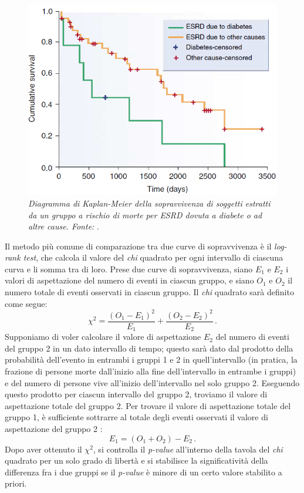 \begin{figure}[htp]
\centering
\includegraphics[scale=0.78]{Immagini/mm_kaplanmeier2.png}
\caption{\label{fig:mm_kaplanmeier2} \textit{Diagramma di Kaplan-Meier della sopravvivenza di soggetti estratti da un gruppo a rischio di morte per ESRD dovuta a diabete o ad altre cause. Fonte:} \cite{Jager2008}.}
\end{figure}

Il metodo più comune di comparazione tra due curve di sopravvivenza è il \textit{log-rank test}, che calcola il valore del \textit{chi} quadrato per ogni intervallo di ciascuna curva e li somma tra di loro. Prese due curve di sopravvivenza, siano $E_1$ e $E_2$ i valori di aspettazione del numero di eventi in ciascun gruppo, e siano $O_1$ e $O_2$ il numero totale di eventi osservati in ciascun gruppo. Il \textit{chi} quadrato sarà definito come segue:
\begin{equation}
    \chi^2 = \frac{(O_1-E_1)^2}{E_1} + \frac{(O_2-E_2)^2}{E_2}\,.
\end{equation}
Supponiamo di voler calcolare il valore di aspettazione $E_2$ del numero di eventi del gruppo 2 in un dato intervallo di tempo; questo sarà dato dal prodotto della probabilità dell'evento in entrambi i gruppi 1 e 2 in quell'intervallo (in pratica, la frazione di persone morte dall'inizio alla fine dell'intervallo in entrambe i gruppi) e del numero di persone vive all'inizio dell'intervallo nel solo gruppo 2. Eseguendo questo prodotto per ciascun intervallo del gruppo 2, troviamo il valore di aspettazione totale del gruppo 2. Per trovare il valore di aspettazione totale del gruppo 1, è sufficiente sottrarre al totale degli eventi osservati il valore di aspettazione del gruppo 2 \cite{Goel2010}:
\begin{equation}
    E_1 = (O_1+O_2)-E_2\,.
\end{equation}
Dopo aver ottenuto il $\chi^2$, si controlla il \textit{p-value} all'interno della tavola del \textit{chi} quadrato per un solo grado di libertà e si stabilisce la significatività della differenza fra i due gruppi se il \textit{p-value} è minore di un certo valore stabilito a priori.

